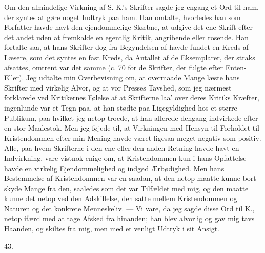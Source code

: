 \documentclass[12pt,a4paper,openany]{book}
\newcommand{\secnum}[1]{\par\begin{center}#1\end{center}\par\nobreak}
\newcommand{\opage}[1]{\marginnote{\footnotesize\textit{[#1]}}}
\begin{document}
Om den almindelige Virkning af S. K.’s Skrifter sagde jeg engang et Ord til
ham, der syntes at gøre noget Indtryk paa ham. Han omtalte, hvorledes han som
Forfatter havde havt den ejendommelige Skæbne, at udgive det ene Skrift efter
det andet uden at fremkalde en egentlig Kritik, angribende eller rosende. Han
fortalte saa, at hans Skrifter dog fra Begyndelsen af havde fundet en Kreds af
Læsere, som det syntes en fast Kreds, da Antallet af de Eksemplarer, der
straks afsattes, omtrent var det samme (c. 70 for de Skrifter, der fulgte
efter Enten-Eller). Jeg udtalte min Overbevisning om, at overmaade Mange
læste hans Skrifter med virkelig Alvor, og at vor Presses Tavshed, som jeg
nærmest forklarede ved Kritikernes Følelse af at Skrifterne
laa’ over deres Kritiks Kræfter, ingenlunde var et Tegn paa, at han stødte paa
Ligegyldighed hos et større Publikum, paa hvilket jeg netop troede, at han
allerede dengang indvirkede efter en stor Maalestok. Men jeg føjede til, at
Virkningen med Hensyn til Forholdet til Kristendommen efter min Mening havde
været ligesaa meget negativ som positiv. Alle, paa hvem Skrifterne i den ene
eller den anden Retning havde havt en Indvirkning, vare vistnok enige om, at
Kristendommen kun i hans Opfattelse havde en virkelig Ejendommelighed og
indgød Ærbødighed. Men hans Bestemmelse af Kristendommen var en saadan, at den
netop maatte kunne bort%
\opage{368}skyde Mange fra den, saaledes som det var Tilfældet med mig, og den
maatte kunne det netop ved den Adskillelse, den satte mellem Kristendommen og
Naturen og det konkrete Menneskeliv. --- Vi vare, da jeg sagde disse Ord til
K., netop ifærd med at tage Afsked fra hinanden; han blev alvorlig og gav mig
tavs Haanden, og skiltes fra mig, men med et venligt Udtryk i sit Ansigt.

\secnum{43.}
\end{document}
